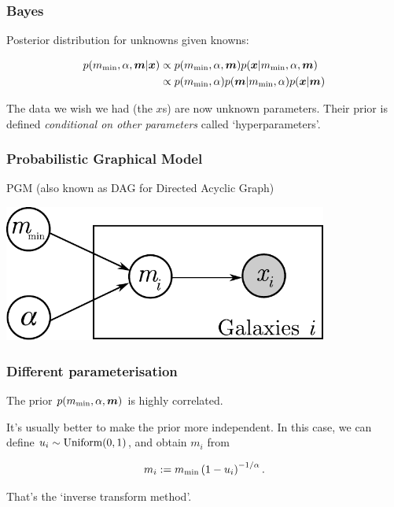 \documentclass{beamer}
\begin{document}
\begin{frame}[t,plain]
\frametitle{Bayes}
Posterior distribution for unknowns given knowns:\vspace{1.5em}

\begin{align}
p(m_{\rm min}, \alpha, \boldsymbol{m} | \boldsymbol{x})
  &\propto
    p(m_{\rm min}, \alpha, \boldsymbol{m})
    p(\boldsymbol{x} | m_{\rm min}, \alpha, \boldsymbol{m})\\
  &\propto
    p(m_{\rm min}, \alpha)p(\boldsymbol{m} | m_{\rm min}, \alpha)
    p(\boldsymbol{x} | \boldsymbol{m}) 
\end{align}

The data we wish we had (the $x$s) are now unknown parameters.
Their prior is defined {\em conditional on other parameters} called
`hyperparameters'.


\end{frame}


\begin{frame}[t,plain]
\frametitle{Probabilistic Graphical Model}
PGM (also known as DAG for Directed Acyclic Graph)\vspace{1em}

\begin{center}
\includegraphics[width=0.8\textwidth]{pgm.pdf}
\end{center}

\end{frame}


\begin{frame}[t,plain]
\frametitle{Different parameterisation}

The prior $p(m_{\rm min}, \alpha, \boldsymbol{m})$ is highly correlated.\vspace{1em}

It's usually better to make the prior more independent. In this case, we can
define $u_i \sim \textnormal{Uniform}(0,1)$, and obtain $m_i$ from

\begin{align}
m_i := m_{\rm min}\left(1 - u_i\right)^{-1/\alpha}.
\end{align}

That's the `inverse transform method'.

\end{frame}
\end{document}
